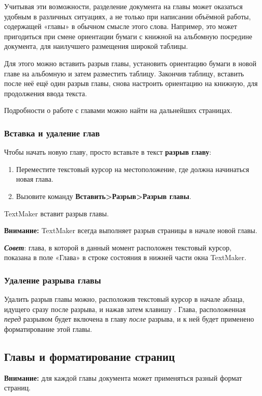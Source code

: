 \documentclass[a4paper,10pt]{article}
\begin{document}
Учитывая эти возможности, разделение документа на главы может оказаться удобным в различных ситуациях, а не только при написании объёмной работы, содержащей «главы» в обычном смысле этого слова. Например, это может пригодиться при смене ориентации бумаги с книжной на альбомную посредине документа, для наилучшего размещения широкой таблицы.

Для этого можно вставить разрыв главы, установить ориентацию бумаги в новой главе на альбомную и затем разместить таблицу. Закончив таблицу, вставить после неё ещё один разрыв главы, снова настроить ориентацию на книжную, для продолжения ввода текста.

Подробности о работе с главами можно найти на дальнейших страницах.

\subsubsection{Вставка и удаление глав}
Чтобы начать новую главу, просто вставьте в текст \textbf{разрыв главу}:
\begin{enumerate}
 \item Переместите текстовый курсор на местоположение, где должна начинаться новая глава.
 \item Вызовите команду \textbf{Вставить>Разрыв>Разрыв главы}.\\
 \end{enumerate}
 
 TextMaker вставит разрыв главы.
 
 \begin{mdframed}[backgroundcolor=blue!10]
\textbf{Внимание:} TextMaker всегда выполняет разрыв страницы в начале новой главы.
\end{mdframed}

\textbf{\textit{Совет}}: глава, в которой в данный момент расположен текстовый курсор, показана в поле «Глава» в строке состояния в нижней части окна TextMaker.

\subsubsection{Удаление разрыва главы}
Удалить разрыв главы можно, расположив текстовый курсор в начале абзаца, идущего сразу после разрыва, и нажав затем клавишу . Глава, расположенная \textit{перед} разрывом будет включена в главу \textit{после} разрыва, и к ней будет применено форматирование этой главы.

\subsection{Главы и форматирование страниц}
\begin{mdframed}[backgroundcolor=blue!10]
\textbf{Внимание:} для каждой главы документа может применяться разный формат страниц.
\end{mdframed}
\end{document}
